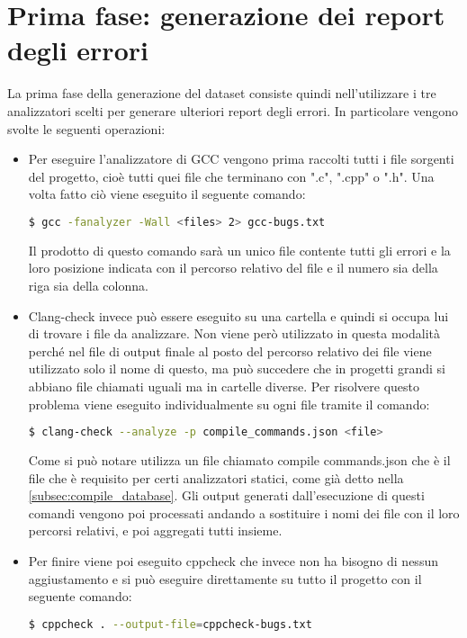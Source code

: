 \section{Prima fase: generazione dei report degli errori}
La prima fase della generazione del dataset consiste quindi nell'utilizzare i tre analizzatori scelti per generare ulteriori report degli errori. 
In particolare vengono svolte le seguenti operazioni:
    \begin{itemize}
      \item Per eseguire l'analizzatore di GCC vengono prima raccolti tutti i file sorgenti del progetto, cioè tutti quei file che terminano con ".c", ".cpp" o ".h". Una volta fatto ciò viene eseguito il seguente comando:
            \begin{lstlisting}[language=bash]
              $ gcc -fanalyzer -Wall <files> 2> gcc-bugs.txt
            \end{lstlisting}
            Il prodotto di questo comando sarà un unico file contente tutti gli errori e la loro posizione indicata con il percorso relativo del file e il numero sia della riga sia della colonna.
      \item Clang-check invece può essere eseguito su una cartella e quindi si occupa lui di trovare i file da analizzare.
             Non viene però utilizzato in questa modalità perché nel file di output finale al posto del percorso relativo dei file viene utilizzato solo il nome di questo, ma può succedere che in progetti grandi si abbiano file chiamati uguali ma in cartelle diverse.
             Per risolvere questo problema viene eseguito individualmente su ogni file tramite il comando:
            \begin{lstlisting}[language=bash]
              $ clang-check --analyze -p compile_commands.json <file>
            \end{lstlisting}
            Come si può notare utilizza un file chiamato compile commands.json che è il file che è requisito per certi analizzatori statici, come già detto nella \autoref{subsec:compile_database}.
            Gli output generati dall'esecuzione di questi comandi vengono poi processati andando a sostituire i nomi dei file con il loro percorsi relativi, e poi aggregati tutti insieme. 
      \item Per finire viene poi eseguito cppcheck che invece non ha bisogno di nessun aggiustamento e si può eseguire direttamente su tutto il progetto con il seguente comando:
              \begin{lstlisting}[language=bash]
                $ cppcheck . --output-file=cppcheck-bugs.txt
              \end{lstlisting}
    \end{itemize}


